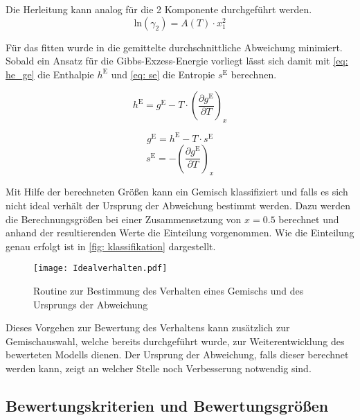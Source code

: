 \documentclass[../thesis.tex]{subfiles}
\begin{document}
Die Herleitung kann analog für die 2 Komponente durchgeführt werden.
\begin{equation}
	\mathrm{ln}(\gamma_2) = A(T) \cdot x_1^2
\end{equation}

Für das fitten wurde in \cite{jaubert2020benchmark} die gemittelte durchschnittliche Abweichung minimiert. Sobald ein Ansatz für die Gibbs-Exzess-Energie vorliegt lässt sich damit mit \autoref{eq: he_ge} die Enthalpie $h^{\mathrm{E}}$ und \autoref{eq: se} die Entropie $s^{\mathrm{E}}$ berechnen.

\begin{equation}
	\label{eq: he_ge}
	h^{\mathrm{E}} = g^{\mathrm{E}} - T \cdot \left( \dfrac{\partial g^{\mathrm{E}}}{\partial T} \right)_x
\end{equation}

\begin{equation}
	\label{eq: se_ansatz}
	g^{\mathrm{E}} = h^{\mathrm{E}} - T \cdot s^{\mathrm{E}}
\end{equation}
\begin{equation}
	\label{eq: se}
	s^{\mathrm{E}} = - \left( \dfrac{\partial g^{\mathrm{E}}}{\partial T} \right)_x
\end{equation}

Mit Hilfe der berechneten Größen kann ein Gemisch klassifiziert und falls es sich nicht ideal verhält der Ursprung der Abweichung bestimmt werden. Dazu werden die Berechnungsgrößen bei einer Zusammensetzung von $x=\text{0.5}$ berechnet und anhand der resultierenden Werte die Einteilung vorgenommen. Wie die Einteilung genau erfolgt ist in \autoref{fig: klassifikation} dargestellt.

\begin{figure}[htbp]
	\centering
	\texttt{[image: Idealverhalten.pdf]}
	\caption{Routine zur Bestimmung des Verhalten eines Gemischs und des Ursprungs der Abweichung}
	\label{fig: klassifikation}
\end{figure}

Dieses Vorgehen zur Bewertung des Verhaltens kann zusätzlich zur Gemischauswahl, welche bereits durchgeführt wurde, zur Weiterentwicklung des bewerteten Modells dienen. Der Ursprung der Abweichung, falls dieser berechnet werden kann, zeigt an welcher Stelle noch Verbesserung notwendig sind.  

\subsection{Bewertungskriterien und Bewertungsgrößen}
\end{document}
